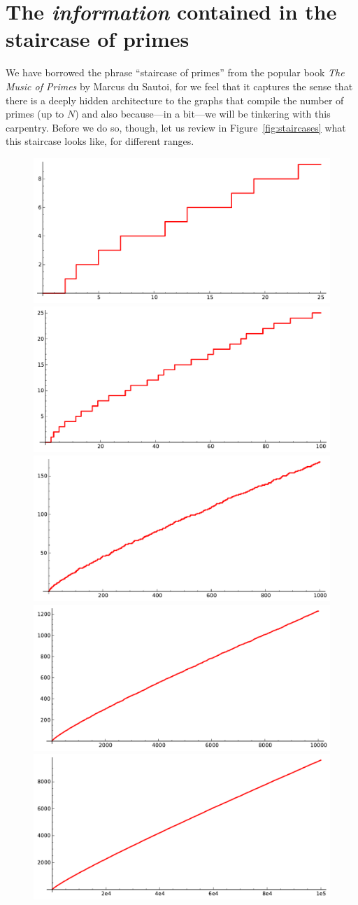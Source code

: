 \documentclass[openany]{book}
\theoremstyle{plain}
\theoremstyle{definition}
\begin{document}
{{\chapter[The staircase of primes]{The {\em information} contained in the staircase of primes\label{sec:information}}



We have borrowed the phrase ``staircase of primes'' from the popular
book {\em The Music of Primes} by Marcus du Sautoi, for we feel that
it captures the sense that there is a deeply hidden architecture to
the graphs that compile the number of primes (up to $N$) and also
because---in a bit---we will be tinkering with this carpentry.  Before
we do so, though, let us review in Figure~\ref{fig:staircases}
what this staircase looks like, for
different ranges.

\begin{figure}[H]
\centering
\includegraphics[width=.4\textwidth]{illustrations/PN_25}
\includegraphics[width=.4\textwidth]{illustrations/PN_100}\\

\includegraphics[width=.4\textwidth]{illustrations/PN_1000}
\includegraphics[width=.4\textwidth]{illustrations/PN_10000}\\

\includegraphics[width=.6\textwidth]{illustrations/PN_100000}



\end{figure}}}
\end{document}
